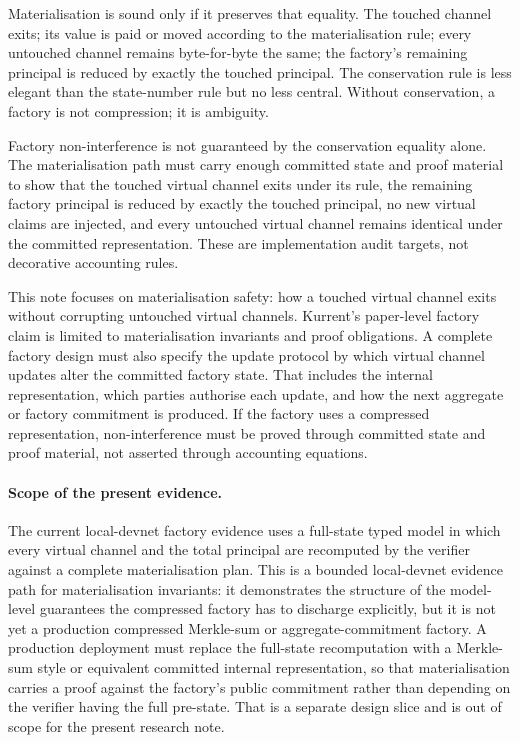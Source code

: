 \documentclass[10pt,a4paper]{article}
\begin{document}
Materialisation is sound only if it preserves that equality. The touched channel exits; its value is paid or moved according to the materialisation rule; every untouched channel remains byte-for-byte the same; the factory's remaining principal is reduced by exactly the touched principal. The conservation rule is less elegant than the state-number rule but no less central. Without conservation, a factory is not compression; it is ambiguity.

Factory non-interference is not guaranteed by the conservation equality alone. The materialisation path must carry enough committed state and proof material to show that the touched virtual channel exits under its rule, the remaining factory principal is reduced by exactly the touched principal, no new virtual claims are injected, and every untouched virtual channel remains identical under the committed representation. These are implementation audit targets, not decorative accounting rules.

This note focuses on materialisation safety: how a touched virtual channel exits without corrupting untouched virtual channels. Kurrent's paper-level factory claim is limited to materialisation invariants and proof obligations. A complete factory design must also specify the update protocol by which virtual channel updates alter the committed factory state. That includes the internal representation, which parties authorise each update, and how the next aggregate or factory commitment is produced. If the factory uses a compressed representation, non-interference must be proved through committed state and proof material, not asserted through accounting equations.

\paragraph{Scope of the present evidence.} The current local-devnet factory evidence uses a full-state typed model in which every virtual channel and the total principal are recomputed by the verifier against a complete materialisation plan. This is a bounded local-devnet evidence path for materialisation invariants: it demonstrates the structure of the model-level guarantees the compressed factory has to discharge explicitly, but it is not yet a production compressed Merkle-sum or aggregate-commitment factory. A production deployment must replace the full-state recomputation with a Merkle-sum style or equivalent committed internal representation, so that materialisation carries a proof against the factory's public commitment rather than depending on the verifier having the full pre-state. That is a separate design slice and is out of scope for the present research note.
\end{document}
